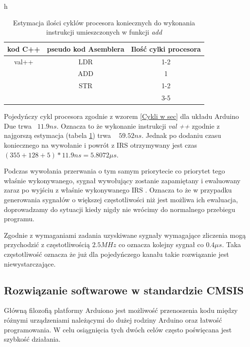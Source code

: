 \documentclass[a4paper,12pt]{article}
\begin{document}
\begin{table}{h}
        \begin{center}
        \caption{Estymacja ilości cyklów procesora koniecznych do wykonania instrukcji umieszczonych w funkcji \textit{add} }
        \label{decompile add}
        \begin{tabular}{c|c|c}
                kod C++ & pseudo kod Asemblera & Ilość cylki procesora \cite{cycles} \\ \hline
                val++ & LDR & 1-2 \\
                        & ADD & 1 \\
                        & STR & 1-2 \\ 
                        \hline \hline
                        &   &  3-5 
        \end{tabular}
        \end{center}
\end{table}

Pojedyńczy cykl procesora zgodnie z wzorem \ref{Cykli w sec} dla układu Arduino Due trwa ~$ 11.9 ns $. 
Oznacza to że wykonanie instrukcji \textit{val ++} zgodnie z najgorszą estymacja (tabela \ref{decompile add}) trwa ~ $59.52 ns$. 
Jednak po dodaniu czasu koniecznego na wywołanie i powrót z IRS otrzymywany jest czas $ (355 + 128 + 5) * 11.9 ns =  5.8072 \mu s $. 

Podczas wywołania przerwania o tym samym priorytecie co priorytet tego właśnie wykonywanego, sygnał wywołujący zostanie zapamiętany i ewaluowany zaraz po wyjściu z właśnie wykonywanego IRS  \cite{datasheet}. 
Oznacza to że w przypadku generowania sygnałów o większej częstotliwości niż jest możliwa ich ewaluacja, doprowadzamy do sytuacji kiedy nigdy nie wrócimy do normalnego przebiegu programu. 

Zgodnie z wymaganiami zadania uzyskiwane sygnały wymagające zliczenia mogą przychodzić z częstotliwością $2.5MHz$ co oznacza kolejny sygnał co $0.4\mu s$.
Taka częstotliwość oznacza że już dla pojedyńczego kanału takie rozwiązanie jest niewystarczające. 

\subsection{Rozwiązanie softwarowe w standardzie CMSIS}
Główną filozofią platformy Arduiono jest możliwość przenoszenia kodu między różnymi urządzeniami należącymi do dużej rodziny Arduino oraz łatwość programowania.
W celu osiągnięcia tych dwóch celów często poświęcana jest szybkość działania. 
\end{document}
